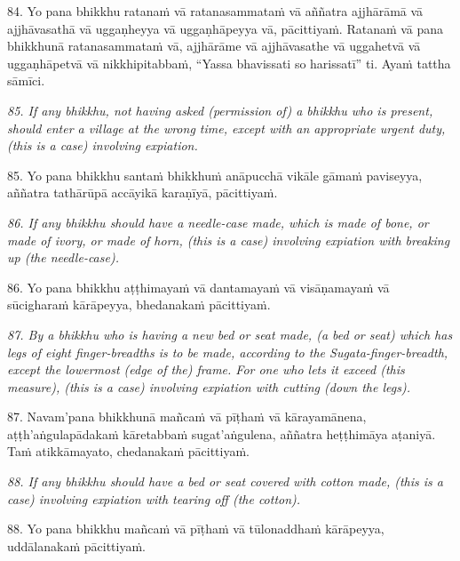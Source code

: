 \documentclass[11pt]{article}
\begin{document}
\begin{paracol}{2}
\begin{column}
\begin{flushleft}
84. Yo pana bhikkhu ratanaṁ vā ratanasammataṁ vā aññatra ajjhārāmā vā ajjhāvasathā vā uggaṇheyya vā uggaṇhāpeyya vā, pācittiyaṁ. Ratanaṁ vā pana bhikkhunā ratanasammataṁ vā, ajjhārāme vā ajjhāvasathe vā uggahetvā vā uggaṇhāpetvā vā nikkhipitabbaṁ, “Yassa bhavissati so harissatī” ti. Ayaṁ tattha sāmīci.
\switchcolumn*
\end{flushleft}

{\itshape\footnotesize
85. If any bhikkhu, not having asked (permission of) a bhikkhu who is present, should enter a village at the wrong time, except with an appropriate urgent duty, (this is a case) involving expiation.
}
\switchcolumn

\begin{flushleft}
85. Yo pana bhikkhu santaṁ bhikkhuṁ anāpucchā vikāle gāmaṁ paviseyya, aññatra tathārūpā accāyikā karaṇīyā, pācittiyaṁ.
\switchcolumn*
\end{flushleft}

{\itshape\footnotesize
86. If any bhikkhu should have a needle-case made, which is made of bone, or made of ivory, or made of horn, (this is a case) involving expiation with breaking up (the needle-case).
}
\switchcolumn

\begin{flushleft}
86. Yo pana bhikkhu aṭṭhimayaṁ vā dantamayaṁ vā visāṇamayaṁ vā sūcigharaṁ kārāpeyya, bhedanakaṁ pācittiyaṁ.
\switchcolumn*
\end{flushleft}

{\itshape\footnotesize
87. By a bhikkhu who is having a new bed or seat made, (a bed or seat) which has legs of eight finger-breadths is to be made, according to the Sugata-finger-breadth, except the lowermost (edge of the) frame. For one who lets it exceed (this measure), (this is a case) involving expiation with cutting (down the legs).
}
\switchcolumn

\begin{flushleft}
87. Navam’pana bhikkhunā mañcaṁ vā pīṭhaṁ vā kārayamānena, aṭṭh’aṅgulapādakaṁ kāretabbaṁ sugat’aṅgulena, aññatra heṭṭhimāya aṭaniyā. Taṁ atikkāmayato, chedanakaṁ pācittiyaṁ.
\switchcolumn*
\end{flushleft}

{\itshape\footnotesize
88. If any bhikkhu should have a bed or seat covered with cotton made, (this is a case) involving expiation with tearing off (the cotton).
}
\switchcolumn

\begin{flushleft}
88. Yo pana bhikkhu mañcaṁ vā pīṭhaṁ vā tūlonaddhaṁ kārāpeyya, uddālanakaṁ pācittiyaṁ.
\switchcolumn*
\end{flushleft}


\end{column}
\end{paracol}
\end{document}
